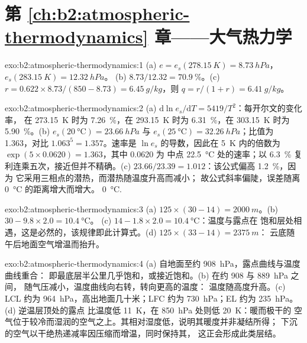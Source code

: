 \section*{第 \ref{ch:b2:atmospheric-thermodynamics} 章——大气热力学}

\begin{solution}{exo:b2:atmospheric-thermodynamics:1}
(a) $e = e_s(\qty{278.15}{K}) = \qty{8.73}{hPa}$，$e_s(\qty{283.15}{K}) = \qty{12.32}{hPa}$。
(b) $8.73/12.32 = \qty{70.9}{\percent}$。(c) $r = 0.622 \times 8.73/(850 - 8.73) =
\qty{6.45}{g/kg}$，则 $q = r/(1 + r) = \qty{6.41}{g/kg}$。
\end{solution}

\begin{solution}{exo:b2:atmospheric-thermodynamics:2}
(a) $\mathrm{d}\ln e_s/\mathrm{d}T = 5419/T^2$：每开尔文的变化率，
在 \qty{273.15}{K} 时为 \qty{7.26}{\percent}，在 \qty{293.15}{K} 时为 \qty{6.31}{\percent}，在
\qty{303.15}{K} 时为 \qty{5.90}{\percent}。(b) $e_s(\qty{20}{\celsius}) = \qty{23.66}{hPa}$ 与 $e_s(\qty{25}{\celsius})
= \qty{32.26}{hPa}$；比值为 1.363，对比 $1.063^5 = 1.357$。速率是
$\ln e_s$ 的导数，因此在 \qty{5}{K} 内的倍数为 $\exp(5 \times 0.0620) = 1.363$，其中 0.0620 为
中点 \qty{22.5}{\celsius} 处的速率；以 \qty{6.3}{\percent} 复利连乘五次，接近但并不精确。(c) $23.66/23.39 = 1.012$：该公式偏高 \qty{1.2}{\percent}，因为
它采用三相点的潜热，而潜热随温度升高而减小；
故公式斜率偏陡，误差随离
\qty{0}{\celsius} 的距离增大而增大。
\qty{0}{\celsius}.
\end{solution}

\begin{solution}{exo:b2:atmospheric-thermodynamics:3}
(a) $125 \times (30 - 14) = \qty{2000}{m}$。(b) $30 - 9.8 \times 2.0 = \qty{10.4}{\celsius}$。
(c) $14 - 1.8 \times 2.0 = \qty{10.4}{\celsius}$：温度与露点在
饱和层处相遇，这是必然的，该规律即此计算式。(d) $125 \times (33 - 14) = \qty{2375}{m}$：
云底随午后地面空气增温而抬升。
\end{solution}

\begin{solution}{exo:b2:atmospheric-thermodynamics:4}
(a) 自地面至约 \qty{908}{hPa}，露点曲线与温度曲线重合：
即最底层半公里几乎饱和，或接近饱和。(b) 在约 908 与 \qty{889}{hPa} 之间，
随气压减小，温度曲线向右转，转向更高的温度：
温度随高度升高。(c) LCL 约为 \qty{964}{hPa}，高出地面几十米；LFC
约为 \qty{730}{hPa}；EL 约为 \qty{235}{hPa}。(d) 逆温层顶处的露点
比温度低 \qty{11}{K}，在 \qty{850}{hPa} 处则低 \qty{20}{K}：暖而极干的
空气位于较冷而湿润的空气之上。其相对湿度低，说明其暖度并非凝结所得；
下沉的空气以干绝热递减率因压缩而增温，同时保持其，
这正会形成此类层结。
\end{solution}

